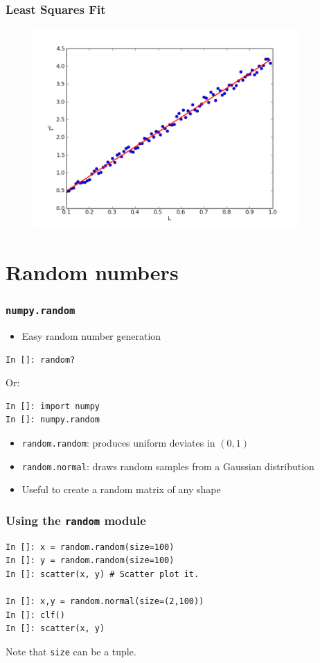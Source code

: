 \documentclass[14pt,compress]{beamer}
\newcommand{\typ}[1]{\lstinline{#1}}
\begin{document}
\begin{frame}[fragile]
\frametitle{Least Squares Fit}
\vspace{-0.15in}
\begin{figure}
\includegraphics[width=4in]{data/least-sq-fit}
\end{figure}
\end{frame}

\section{Random numbers}

\begin{frame}[fragile]
    \frametitle{\typ{numpy.random}}
    \begin{itemize}
        \item Easy random number generation
    \end{itemize}
    \begin{lstlisting}
In []: random?
    \end{lstlisting}
    Or:
    \begin{lstlisting}
In []: import numpy
In []: numpy.random
    \end{lstlisting}
\begin{itemize}
    \item \typ{random.random}: produces uniform deviates in $(0, 1)$
    \item \typ{random.normal}: draws random samples from a Gaussian
        distribution
    \item Useful to create a random matrix of any shape
\end{itemize}
\end{frame}

\begin{frame}[fragile]
    \frametitle{Using the \typ{random} module}
\begin{lstlisting}
In []: x = random.random(size=100)
In []: y = random.random(size=100)
In []: scatter(x, y) # Scatter plot it.

In []: x,y = random.normal(size=(2,100))
In []: clf()
In []: scatter(x, y)
\end{lstlisting}
Note that \typ{size} can be a tuple.

\end{frame}
\end{document}
